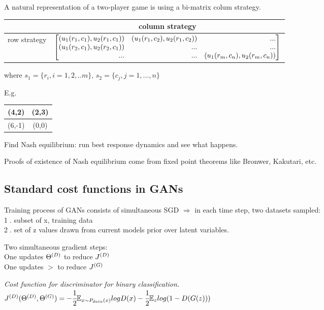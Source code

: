 \documentclass[12pt,a4paper]{article}
\begin{document}
A natural representation of a two-player game is using a bi-matrix colum strategy.

\begin{center}
\begin{tabular}{c | c}
    & column strategy \\
    \hline 
    row strategy & $\vecb{(u_1(r_1,c_1), u_2(r_1,c_1))&(u_1(r_1,c_2), u_2(r_1,c_2))&...\\
    (u_1(r_2,c_1), u_2(r_2,c_1)) & ... & ...\\
    ... & ... & (u_1(r_m,c_n), u_2(r_m,c_n))
    }$\\
\end{tabular}
\end{center}

where $s_1=\{r_i, i=1,2,..m\}$, $s_2=\{c_j, j=1,...,n\}$

E.g.
\begin{center}
\begin{tabular}{|c|c|}
    \hline
    (4,2) & (2,3) \\
    \hline 
    (6,-1) & (0,0)\\
    \hline
\end{tabular}
\end{center}

Find Nash equilibrium: run best response dynamics and see what happens.

Proofs of existence of Nash equilibrium come from fixed point theorems like Bronwer, Kakutari, etc. 

\subsection{Standard cost functions in GANs}
Training process of GANs consists of simultaneous SGD $\Rightarrow$ in each time step, two datasets sampled: \\
\textcircled{1}. subset of x, training data\\
\textcircled{2}. set of z values drawn from current models prior over latent variables.

Two simultaneous gradient steps:\\
One updates ${\Theta^{(D)}}$ to reduce $J^{(D)}$\\
One updates $\gt$ to reduce $J^{(G)}$

\vspace{0.5cm}
\textit{Cost function for discriminator for binary classification.} \\
$J^{(D)}({\Theta^{(D)}},{\Theta^{(G)}})=-\cfrac{1}{2} \mathbb{E}_{x\sim P_{data}(x)}logD(x)-\cfrac{1}{2}\mathbb{E}_zlog(1-D(G(z)))$
\end{document}
